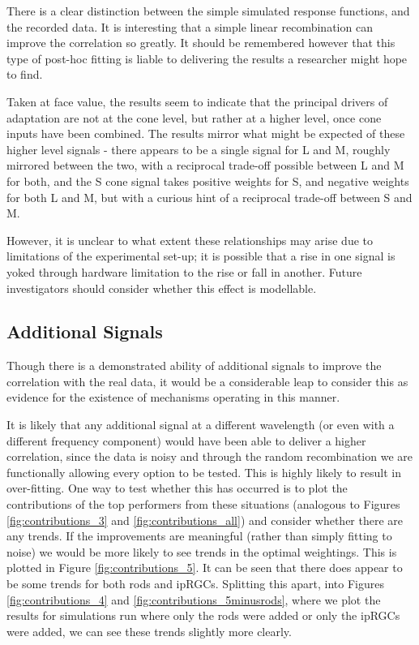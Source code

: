 There is a clear distinction between the simple simulated response functions, and the recorded data. It is interesting that a simple linear recombination can improve the correlation so greatly. It should be remembered however that this type of post-hoc fitting is liable to delivering the results a researcher might hope to find. 

Taken at face value, the results seem to indicate that the principal drivers of adaptation are not at the cone level, but rather at a higher level, once cone inputs have been combined. The results mirror what might be expected of these higher level signals - there appears to be a single signal for L and M, roughly mirrored between the two, with a reciprocal trade-off possible between L and M for both, and the S cone signal takes positive weights for S, and negative weights for both L and M, but with a curious hint of a reciprocal trade-off between S and M.

However, it is unclear to what extent these relationships may arise due to limitations of the experimental set-up; it is possible that a rise in one signal is yoked through hardware limitation to the rise or fall in another. Future investigators should consider whether this effect is modellable.

\subsection{Additional Signals}

Though there is a demonstrated ability of additional signals to improve the correlation with the real data, it would be a considerable leap to consider this as evidence for the existence of mechanisms operating in this manner.

It is likely that any additional signal at a different wavelength (or even with a different frequency component) would have been able to deliver a higher correlation, since the data is noisy and through the random recombination we are functionally allowing every option to be tested. This is highly likely to result in over-fitting. One way to test whether this has occurred is to plot the contributions of the top performers from these situations (analogous to Figures \ref{fig:contributions_3} and \ref{fig:contributions_all}) and consider whether there are any trends. If the improvements are meaningful (rather than simply fitting to noise) we would be more likely to see trends in the optimal weightings. This is plotted in Figure \ref{fig:contributions_5}. It can be seen that there does appear to be some trends for both rods and \glspl{ipRGC}. Splitting this apart, into Figures \ref{fig:contributions_4} and \ref{fig:contributions_5minusrods}, where we plot the results for simulations run where only the rods were added or only the \glspl{ipRGC} were added, we can see these trends slightly more clearly.

